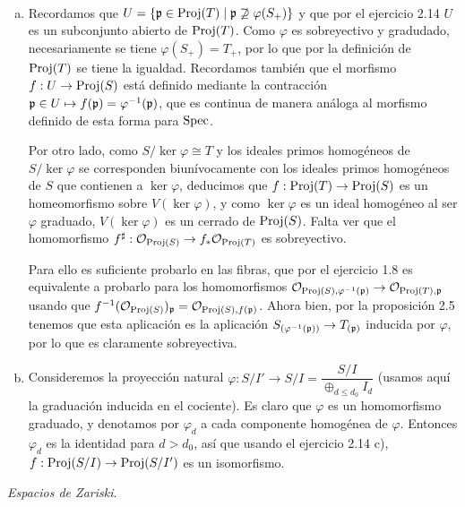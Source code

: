 \documentclass[twoside]{article}
\begin{document}
\begin{solucion}\
\begin{enumerate}[(a)]
\item Recordamos que $U=\{\mathfrak{p}\in\operatorname{Proj}(T)\mid \mathfrak{p}\not\supseteq\varphi(S_+)\}$ y que por el ejercicio 2.14 $U$ es un subconjunto abierto de $\operatorname{Proj}(T)$. Como $\varphi$ es sobreyectivo y gradudado, necesariamente se tiene $\varphi(S_+)=T_+$, por lo que por la definición de $\operatorname{Proj}(T)$ se tiene la igualdad. Recordamos también que el morfismo $f:U\to\operatorname{Proj}(S)$ está definido mediante la contracción $\mathfrak{p}\in U\mapsto f(\mathfrak{p})=\varphi^{-1}(\mathfrak{p})$, que es continua de manera análoga al morfismo definido de esta forma para $\operatorname{Spec}$. 

Por otro lado, como $S/\ker\varphi\cong T$ y los ideales primos homogéneos de $S/\ker\varphi$ se corresponden biunívocamente con los ideales primos homogéneos de $S$ que contienen a $\ker\varphi$, deducimos que $f:\operatorname{Proj}(T)\to\operatorname{Proj}(S)$ es un homeomorfismo sobre $V(\ker\varphi)$, y como $\ker\varphi$ es un ideal homogéneo al ser $\varphi$ graduado, $V(\ker\varphi)$ es un cerrado de $\operatorname{Proj}(S)$. Falta ver que el homomorfismo $f^\sharp:{\mathcal O}_{\operatorname{Proj}(S)}\to f_*{\mathcal O}_{\operatorname{Proj}(T)}$ es sobreyectivo. 

Para ello es suficiente probarlo en las fibras, que por el ejercicio 1.8 es equivalente a probarlo para los homomorfismos ${\mathcal O}_{\operatorname{Proj}(S),\varphi^{-1}(\mathfrak{p})}\to{\mathcal O}_{\operatorname{Proj}(T),\mathfrak{p}}$ usando que $f^{-1}({\mathcal O}_{\operatorname{Proj}(S)})_{\mathfrak{p}}={\mathcal O}_{\operatorname{Proj}(S),f(\mathfrak{p})}$. Ahora bien, por la proposición 2.5 tenemos que esta aplicación es la aplicación $S_{(\varphi^{-1}(\mathfrak{p}))}\to T_{(\mathfrak{p})}$ inducida por $\varphi$, por lo que es claramente sobreyectiva.



\item Consideremos la proyección natural $\varphi:S/I'\to S/I=\dfrac{S/I}{\oplus_{d\leq d_0}I_d}$ (usamos aquí la graduación inducida en el cociente). Es claro que $\varphi$ es un homomorfismo graduado, y denotamos por $\varphi_d$ a cada componente homogénea de $\varphi$. Entonces $\varphi_d$ es la identidad para $d>d_0$, así que usando el ejercicio 2.14 c), $f:\operatorname{Proj}(S/I)\to\operatorname{Proj}(S/I')$ es un isomorfismo. 

\end{enumerate}

\end{solucion}
\newpage
\begin{ejercicio}{3.17}\emph{Espacios de Zariski}. 


\end{ejercicio}
\begin{solucion}
%
\end{solucion}
\end{document}
